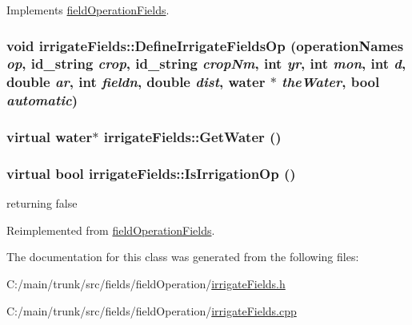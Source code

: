 Implements \hyperlink{classfield_operation_fields_ae5d8585b7e57196ce3801eed29677b3e}{fieldOperationFields}.\hypertarget{classirrigate_fields_ac25be5a54804ed89dd06f30b233240e1}{
\subsubsection[{DefineIrrigateFieldsOp}]{\setlength{\rightskip}{0pt plus 5cm}void irrigateFields::DefineIrrigateFieldsOp ({\bf operationNames} {\em op}, \/  {\bf id\_\-string} {\em crop}, \/  {\bf id\_\-string} {\em cropNm}, \/  int {\em yr}, \/  int {\em mon}, \/  int {\em d}, \/  double {\em ar}, \/  int {\em fieldn}, \/  double {\em dist}, \/  {\bf water} $\ast$ {\em theWater}, \/  bool {\em automatic})}}
\label{classirrigate_fields_ac25be5a54804ed89dd06f30b233240e1}
\hypertarget{classirrigate_fields_a01abb4e549487714b388c0923c390b3a}{
\subsubsection[{GetWater}]{\setlength{\rightskip}{0pt plus 5cm}virtual {\bf water}$\ast$ irrigateFields::GetWater ()}}
\label{classirrigate_fields_a01abb4e549487714b388c0923c390b3a}
\hypertarget{classirrigate_fields_a5ec3ea58a4f844b81c394155e332829c}{
\subsubsection[{IsIrrigationOp}]{\setlength{\rightskip}{0pt plus 5cm}virtual bool irrigateFields::IsIrrigationOp ()}}
\label{classirrigate_fields_a5ec3ea58a4f844b81c394155e332829c}


returning false 

Reimplemented from \hyperlink{classfield_operation_fields_acc173f03d2190f694c9bef2fd1e5a314}{fieldOperationFields}.

The documentation for this class was generated from the following files:\begin{DoxyCompactItemize}
\item 
C:/main/trunk/src/fields/fieldOperation/\hyperlink{irrigate_fields_8h}{irrigateFields.h}\item 
C:/main/trunk/src/fields/fieldOperation/\hyperlink{irrigate_fields_8cpp}{irrigateFields.cpp}\end{DoxyCompactItemize}
